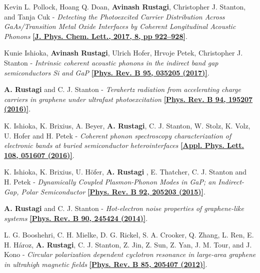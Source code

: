\documentclass[12pt]{article}
\begin{document}
\begin{etaremune}
	\item Kevin L. Pollock, Hoang Q. Doan, {\bf Avinash Rustagi}, Christopher J. Stanton, and Tanja Cuk - \textit{Detecting the Photoexcited Carrier Distribution Across GaAs/Transition Metal Oxide Interfaces by Coherent Longitudinal Acoustic Phonons} \href{http://pubs.acs.org/doi/abs/10.1021/acs.jpclett.6b02835} {\bf [J. Phys. Chem. Lett., 2017, 8, pp 922–928]}.

       \item Kunie Ishioka, {\bf Avinash Rustagi}, Ulrich Hofer, Hrvoje Petek, Christopher J. Stanton - \textit{Intrinsic coherent acoustic phonons in the indirect band gap semiconductors Si and GaP} \href{http://journals.aps.org/prb/abstract/10.1103/PhysRevB.95.035205} {\bf [Phys. Rev. B 95, 035205 (2017)]}.

			\item {\bf A. Rustagi} and C. J. Stanton - \textit{Terahertz radiation from accelerating charge carriers in graphene under ultrafast photoexcitation} \href{https://journals.aps.org/prb/abstract/10.1103/PhysRevB.94.195207} {\bf [Phys. Rev. B 94, 195207 (2016)]}.

      \item K. Ishioka, K. Brixius, A. Beyer, {\bf A. Rustagi}, C. J. Stanton, W. Stolz, K. Volz, U. Hofer and H. Petek - \textit{Coherent phonon spectroscopy characterization of electronic bands at buried semiconductor heterointerfaces} \href{http://scitation.aip.org/content/aip/journal/apl/108/5/10.1063/1.4941397} {\bf [Appl. Phys. Lett. 108, 051607 (2016)]}.

     \item K. Ishioka, K. Brixius, U. H{\"o}fer, {\bf A. Rustagi} , E. Thatcher, C. J. Stanton and H. Petek - \textit{Dynamically Coupled Plasmon-Phonon Modes in GaP; an Indirect-Gap, Polar Semiconductor} \href{http://journals.aps.org/prb/abstract/10.1103/PhysRevB.92.205203}{\bf [Phys. Rev. B 92, 205203 (2015)]}.

     \item {\bf A. Rustagi} and C. J. Stanton - \textit{Hot-electron noise properties of graphene-like systems} \href{http://journals.aps.org/prb/abstract/10.1103/PhysRevB.90.245424}{\bf [Phys. Rev. B 90, 245424 (2014)]}.

    \item L. G. Booshehri, C. H. Mielke, D. G. Rickel, S. A. Crooker, Q. Zhang, L. Ren, E. H. Hároz, {\bf A. Rustagi}, C. J. Stanton, Z. Jin, Z. Sun, Z. Yan, J. M. Tour, and J. Kono - \textit{Circular polarization dependent cyclotron resonance in large-area graphene in ultrahigh magnetic fields} \href{http://journals.aps.org/prb/abstract/10.1103/PhysRevB.85.205407} {\bf [Phys. Rev. B 85, 205407 (2012)]}.

\end{etaremune}
\end{document}
